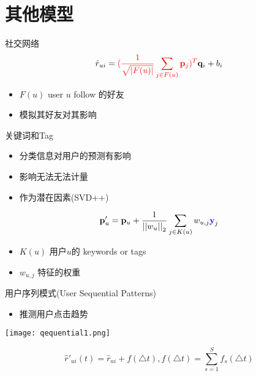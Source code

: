 \documentclass{beamer}
\begin{document}
\section{其他模型}
\begin{frame}{社交网络}
\begin{equation}
    \hat{r}_{ui} = 
    \textcolor{red}{
    ( \frac{1}{\sqrt{\left|F(u)\right|}}
    \sum_{j\in F(u)}\bold{p}_j)^T}
    \bold{q}_i + b_i
    \label{}
\end{equation}

\pause
\begin{itemize}
    \item $F(u)$ user $u$ follow 的好友
    \item 模拟其好友对其影响
\end{itemize}
\end{frame}

\begin{frame}{关键词和Tag}
    \begin{itemize}
        \item 分类信息对用户的预测有影响 
        \item 影响无法无法计量

        \pause
        \item 作为潜在因素(SVD++)
    \end{itemize}
    \begin{equation}
        \bold{p}'_u = 
        \bold{p}_u + 
            \frac{1}{\left|\left|w_u\right|\right|_2}
            \sum_{j\in K(u)} w_{u,j}\bold{\textcolor{blue}{y}}_j
        \label{}
    \end{equation}
    \begin{itemize}
        \item $K(u)$ 用户$u$的 keywords or tags 
        \item $w_{u,j}$ 特征的权重
    \end{itemize}
\end{frame}

\begin{frame}{用户序列模式(User Sequential Patterns)}
    \begin{itemize}
        \item 推测用户点击趋势
    \end{itemize}

    \begin{center}
        \texttt{[image: qequential1.png]}
    \end{center}

    \pause
    \begin{equation}
        \hat{r}'_{ui}{(t)} = 
        \hat{r}_{ui} + f(\triangle  t),
        f(\triangle  t) = \sum_{s=1}^{S} f_s(\triangle  t)
        \label{}
    \end{equation}
\end{frame}
\end{document}

